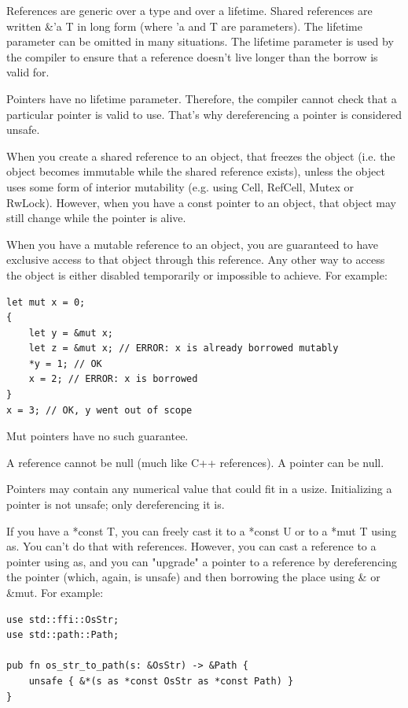 References are generic over a type and over a lifetime. Shared references are written \&'a T in long form (where 'a and T are parameters). The lifetime parameter can be omitted in many situations. The lifetime parameter is used by the compiler to ensure that a reference doesn't live longer than the borrow is valid for.

Pointers have no lifetime parameter. Therefore, the compiler cannot check that a particular pointer is valid to use. That's why dereferencing a pointer is considered unsafe.

When you create a shared reference to an object, that freezes the object (i.e. the object becomes immutable while the shared reference exists), unless the object uses some form of interior mutability (e.g. using Cell, RefCell, Mutex or RwLock). However, when you have a const pointer to an object, that object may still change while the pointer is alive.

When you have a mutable reference to an object, you are guaranteed to have exclusive access to that object through this reference. Any other way to access the object is either disabled temporarily or impossible to achieve. For example:

\begin{lstlisting}
let mut x = 0;
{
	let y = &mut x;
	let z = &mut x; // ERROR: x is already borrowed mutably
	*y = 1; // OK
	x = 2; // ERROR: x is borrowed
}
x = 3; // OK, y went out of scope
\end{lstlisting}

Mut pointers have no such guarantee.

A reference cannot be null (much like C++ references). A pointer can be null.

Pointers may contain any numerical value that could fit in a usize. Initializing a pointer is not unsafe; only dereferencing it is.

If you have a *const T, you can freely cast it to a *const U or to a *mut T using as. You can't do that with references. However, you can cast a reference to a pointer using as, and you can "upgrade" a pointer to a reference by dereferencing the pointer (which, again, is unsafe) and then borrowing the place using \& or \&mut. For example:

\begin{lstlisting}
use std::ffi::OsStr;
use std::path::Path;

pub fn os_str_to_path(s: &OsStr) -> &Path {
	unsafe { &*(s as *const OsStr as *const Path) }
}
\end{lstlisting}

